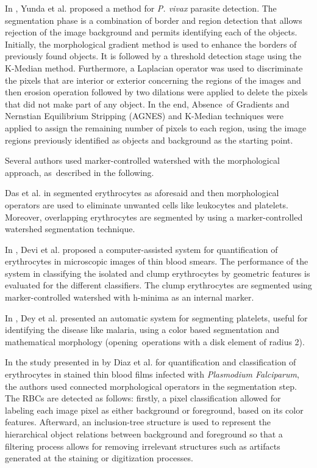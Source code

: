 In \cite{Yunda2012}, Yunda et al. proposed a method for \textit{P. vivax} parasite detection. The segmentation phase is a combination of border and region detection that allows rejection of the image background and permits identifying each of the objects. Initially, the morphological gradient method is used to enhance the borders of previously found objects. It is followed by a threshold detection stage using the K-Median method.
Furthermore, a Laplacian operator was used to discriminate the pixels that are interior or exterior concerning the regions of the images and then erosion operation followed by two dilations were applied to delete the pixels that did not make part of any object. In the end, Absence~of Gradients and Nernstian Equilibrium Stripping (AGNES) and K-Median techniques were applied to assign the remaining number of pixels to each region, using the image regions previously identified as objects and background as the starting point.

Several authors used marker-controlled watershed \cite{Soille2004} with the morphological approach, as~described in the following.

Das et al. in \cite{Das2011, Das2013, Das2014, Das2015} segmented erythrocytes as aforesaid and then morphological operators are used to eliminate unwanted cells like leukocytes and platelets. Moreover, overlapping erythrocytes are segmented by using a marker-controlled watershed segmentation technique.

In \cite{Devi2017}, Devi et al. proposed a computer-assisted system for quantification of erythrocytes in microscopic images of thin blood smears. The performance of the system in classifying the isolated and clump erythrocytes by geometric features is evaluated for the different classifiers. The clump erythrocytes are segmented using marker-controlled watershed with h-minima as an internal marker.

In \cite{Dey2015}, Dey et al. presented an automatic system for segmenting platelets, useful for identifying the disease like malaria, using a color based segmentation and mathematical morphology (opening~operations with a disk element of radius 2).

In the study presented in \cite{Diaz2009} by Diaz et al. for quantification and classification of erythrocytes in stained thin blood films infected with \textit{Plasmodium Falciparum}, the authors used connected morphological operators in the segmentation step. The RBCs are detected as follows: firstly, a pixel classification allowed for labeling each image pixel as either background or foreground, based on its color features. Afterward, an inclusion-tree structure is used to represent the hierarchical object relations between background and foreground so that a filtering process allows for removing irrelevant structures such as artifacts generated at the staining or digitization processes.

